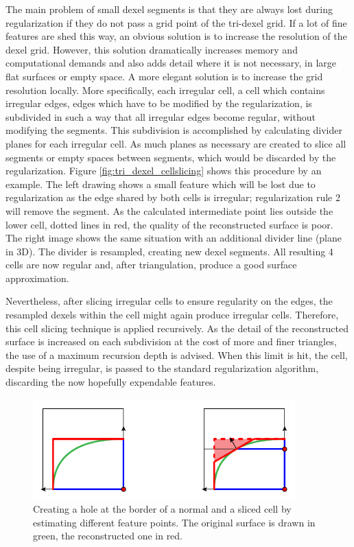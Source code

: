 The main problem of small dexel segments is that they are always lost during regularization if they do not pass a grid point of the tri-dexel grid.
If a lot of fine features are shed this way, an obvious solution is to increase the resolution of the dexel grid.
However, this solution dramatically increases memory and computational demands and also adds detail where it is not necessary, \eg in large flat surfaces or empty space.
A more elegant solution is to increase the grid resolution locally.
More specifically, each irregular cell, \ie a cell which contains irregular edges, \ie edges which have to be modified by the regularization, is subdivided in such a way that all irregular edges become regular, without modifying the segments.
This subdivision is accomplished by calculating divider planes for each irregular cell.
As much planes as necessary are created to slice all segments or empty spaces between segments, which would be discarded by the regularization.
Figure \ref{fig:tri_dexel_cellslicing} shows this procedure by an example.
The left drawing shows a small feature which will be lost due to regularization as the edge shared by both cells is irregular; regularization rule 2 will remove the segment.
As the calculated intermediate point lies outside the lower cell, \cf dotted lines in red, the quality of the reconstructed surface is poor.
The right image shows the same situation with an additional divider line (plane in 3D).
The divider is resampled, creating new dexel segments.
All resulting 4 cells are now regular and, after triangulation, produce a good surface approximation.

Nevertheless, after slicing irregular cells to ensure regularity on the edges, the resampled dexels within the cell might again produce irregular cells.
Therefore, this cell slicing technique is applied recursively.
As the detail of the reconstructed surface is increased on each subdivision at the cost of more and finer triangles, the use of a maximum recursion depth is advised.
When this limit is hit, the cell, despite being irregular, is passed to the standard regularization algorithm, discarding the now hopefully expendable features.

\begin{figure}
	\centering
	\includegraphics[width=0.9\textwidth]{images/tri_dexel_hole_creation}
	\caption{
		Creating a hole at the border of a normal and a sliced cell by estimating different feature points.
		The original surface is drawn in green, the reconstructed one in red.
	}
	\label{fig:tri_dexel_hole_creation}
\end{figure}

